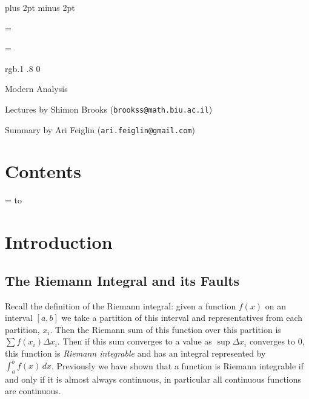 

\parindent=0pt
\parskip=3pt plus 2pt minus 2pt



\footline={}


\headline={}

\color rgb{.1 .8 0}

{\def\boxshadowcolor{rgb{.3 .8 .3}}

    \centerline{Modern Analysis }
    \smallskip
    \centerline{Lectures by Shimon Brooks ({\tt brookss@math.biu.ac.il})}
    \centerline{Summary by Ari Feiglin ({\tt ari.feiglin@gmail.com})}

\eppbox

\bigskip

    \section*{Contents}
    
    \tableofcontents
\eppbox

}

\vfill\break

\color{black}

\newif\ifpageodd
\pageoddtrue
\headline={%
    \hbox to \hsize{\color{black}%
        \ifpageodd\hfil{\it\currsubsection\quad\bf\folio}\global\pageoddfalse%
        \else{\bf\folio\quad\it\currsubsection}\hfil\global\pageoddtrue\fi%
    }%
}

\section{Introduction}

\subsection*{The Riemann Integral and its Faults}

Recall the definition of the Riemann integral: given a function $f(x)$ on an interval $[a,b]$ we take a partition of this interval and representatives from each partition, $x_i$.
Then the Riemann sum of this function over this partition is $\sum f(x_i)\Delta x_i$.
Then if this sum converges to a value as $\sup\Delta x_i$ converges to $0$, this function is {\it Riemann integrable} and has an integral represented by $\int_a^b f(x)\,dx$.
Previously we have shown that a function is Riemann integrable if and only if it is almost always continuous, in particular all continuous functions are continuous.

